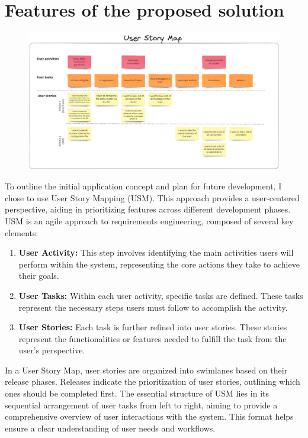 \documentclass[10pt , a4paper]{report}
\begin{document}
\section{Features of the proposed solution}
\label{sec:proposed_features}
\begin{figure}[htbp]
    \centering
    \includegraphics[width=1\linewidth]{imgs/UserStoryMap.png}
    \label{fig:USM}
\end{figure}

To outline the initial application concept and plan for future development, I chose to use User Story Mapping (USM). This approach provides a user-centered perspective, aiding in prioritizing features across different development phases. USM is an agile approach to requirements engineering, composed of several key elements:

\begin{enumerate} \item \textbf{User Activity:} This step involves identifying the main activities users will perform within the system, representing the core actions they take to achieve their goals. \item \textbf{User Tasks:} Within each user activity, specific tasks are defined. These tasks represent the necessary steps users must follow to accomplish the activity. \item \textbf{User Stories:} Each task is further refined into user stories. These stories represent the functionalities or features needed to fulfill the task from the user's perspective. \end{enumerate}

In a User Story Map, user stories are organized into swimlanes based on their release phases. Releases indicate the prioritization of user stories, outlining which ones should be completed first. The essential structure of USM lies in its sequential arrangement of user tasks from left to right, aiming to provide a comprehensive overview of user interactions with the system. This format helps ensure a clear understanding of user needs and workflows.
\end{document}
